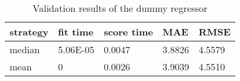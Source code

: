 \begin{table}[H]
    \centering
    \begin{tabular}{l|llll}
    \toprule
    \textbf{strategy} & \textbf{fit time} & \textbf{score time} & \textbf{MAE} & \textbf{RMSE} \\ \midrule
    median            & 5.06E-05          & 0.0047              & 3.8826       & 4.5579  \\
    mean              & 0                 & 0.0026              & 3.9039       & 4.5510  \\
    \bottomrule
    \end{tabular}%
    \caption{Validation results of the dummy regressor}
    \label{tab:val_dummy}
    \end{table}